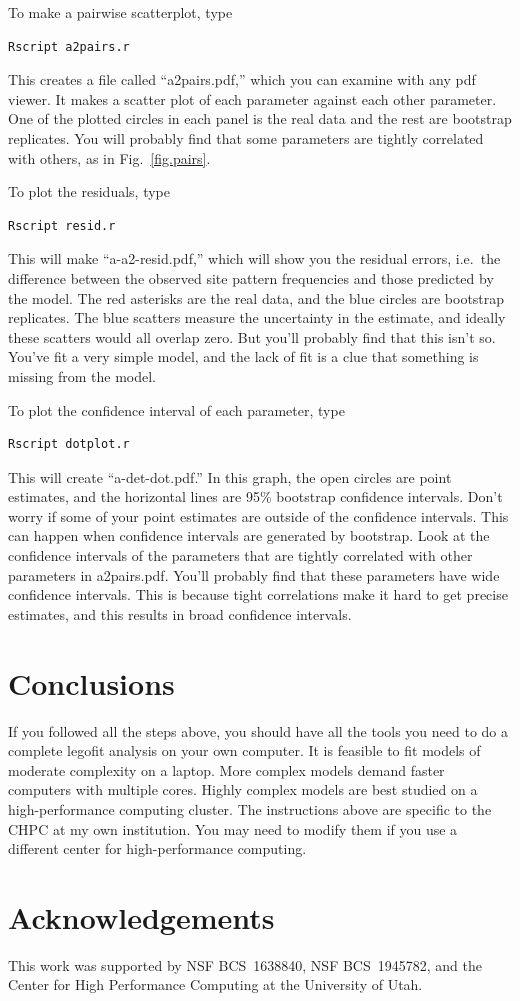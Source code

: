 \documentclass[11pt]{article}
\begin{document}
To make a pairwise scatterplot, type
\begin{verbatim}
Rscript a2pairs.r
\end{verbatim}
This creates a file called ``a2pairs.pdf,'' which you can examine with
any pdf viewer. It makes a scatter plot of each parameter against each
other parameter. One of the plotted circles in each panel is the real
data and the rest are bootstrap replicates. You will probably find
that some parameters are tightly correlated with others, as in
Fig.~\ref{fig.pairs}.

To plot the residuals, type
\begin{verbatim}
Rscript resid.r
\end{verbatim}
This will make ``a-a2-resid.pdf,'' which will show you the residual
errors, i.e.\ the difference between the observed site pattern
frequencies and those predicted by the model. The red asterisks are
the real data, and the blue circles are bootstrap replicates. The blue
scatters measure the uncertainty in the estimate, and ideally these
scatters would all overlap zero. But you'll probably find that this
isn't so. You've fit a very simple model, and the lack of fit is a
clue that something is missing from the model.

To plot the confidence interval of each parameter, type
\begin{verbatim}
Rscript dotplot.r
\end{verbatim}
This will create ``a-det-dot.pdf.'' In this graph, the open circles
are point estimates, and the horizontal lines are 95\% bootstrap
confidence intervals. Don't worry if some of your point estimates are
outside of the confidence intervals. This can happen when confidence
intervals are generated by bootstrap. Look at the confidence intervals
of the parameters that are tightly correlated with other parameters in
a2pairs.pdf. You'll probably find that these parameters have wide
confidence intervals. This is because tight correlations make it hard
to get precise estimates, and this results in broad confidence
intervals. 

\section{Conclusions}
\label{sec.conclusions}
If you followed all the steps above, you should have all the tools you
need to do a complete legofit analysis on your own computer. It is
feasible to fit models of moderate complexity on a laptop. More
complex models demand faster computers with multiple cores. Highly
complex models are best studied on a high-performance computing
cluster. The instructions above are specific to the CHPC at my own
institution. You may need to modify them if you use a different center
for high-performance computing.

\section*{Acknowledgements}
This work was supported by NSF BCS~1638840, NSF BCS~1945782, and the Center
for High Performance Computing at the University of Utah.

\printbibliography
\end{document}
